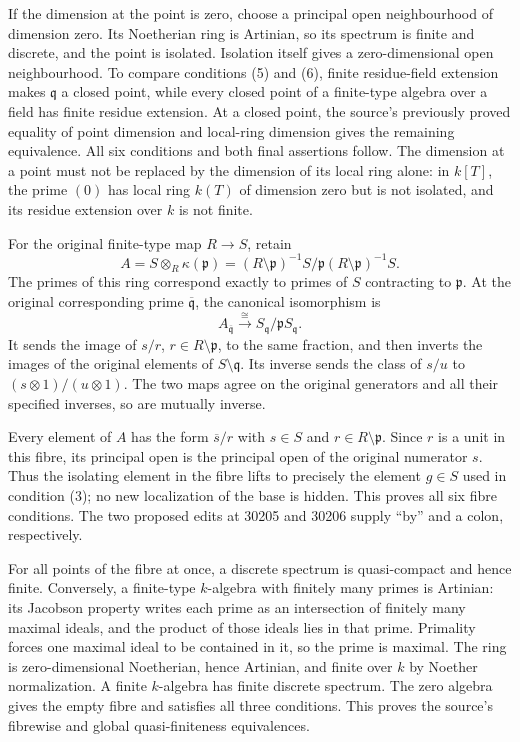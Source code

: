 If the dimension at the point is zero, choose a principal open neighbourhood of dimension zero. Its Noetherian ring is Artinian, so its spectrum is finite and discrete, and the point is isolated. Isolation itself gives a zero-dimensional open neighbourhood. To compare conditions (5) and (6), finite residue-field extension makes \(\mathfrak q\) a closed point, while every closed point of a finite-type algebra over a field has finite residue extension. At a closed point, the source's previously proved equality of point dimension and local-ring dimension gives the remaining equivalence. All six conditions and both final assertions follow. The dimension at a point must not be replaced by the dimension of its local ring alone: in \(k[T]\), the prime \((0)\) has local ring \(k(T)\) of dimension zero but is not isolated, and its residue extension over \(k\) is not finite.

For the original finite-type map \(R\to S\), retain \[
 A=S\otimes_R\kappa(\mathfrak p)
   =(R\setminus\mathfrak p)^{-1}S/
            \mathfrak p(R\setminus\mathfrak p)^{-1}S.
\] The primes of this ring correspond exactly to primes of \(S\) contracting to \(\mathfrak p\). At the original corresponding prime \(\overline{\mathfrak q}\), the canonical isomorphism is \[
 A_{\overline{\mathfrak q}}\xrightarrow{\cong}
 S_{\mathfrak q}/\mathfrak pS_{\mathfrak q}.
\] It sends the image of \(s/r\), \(r\in R\setminus\mathfrak p\), to the same fraction, and then inverts the images of the original elements of \(S\setminus\mathfrak q\). Its inverse sends the class of \(s/u\) to \((s\otimes1)/(u\otimes1)\). The two maps agree on the original generators and all their specified inverses, so are mutually inverse.

Every element of \(A\) has the form \(\overline s/r\) with \(s\in S\) and \(r\in R\setminus\mathfrak p\). Since \(r\) is a unit in this fibre, its principal open is the principal open of the original numerator \(s\). Thus the isolating element in the fibre lifts to precisely the element \(g\in S\) used in condition (3); no new localization of the base is hidden. This proves all six fibre conditions. The two proposed edits at 30205 and 30206 supply ``by'' and a colon, respectively.

For all points of the fibre at once, a discrete spectrum is quasi-compact and hence finite. Conversely, a finite-type \(k\)-algebra with finitely many primes is Artinian: its Jacobson property writes each prime as an intersection of finitely many maximal ideals, and the product of those ideals lies in that prime. Primality forces one maximal ideal to be contained in it, so the prime is maximal. The ring is zero-dimensional Noetherian, hence Artinian, and finite over \(k\) by Noether normalization. A finite \(k\)-algebra has finite discrete spectrum. The zero algebra gives the empty fibre and satisfies all three conditions. This proves the source's fibrewise and global quasi-finiteness equivalences.

